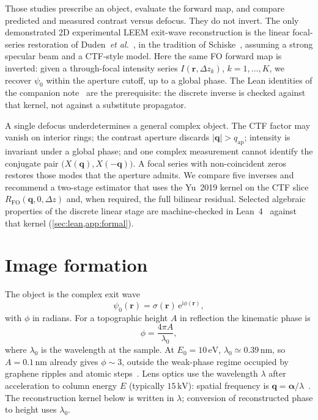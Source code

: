 \documentclass[11pt,a4paper]{article}
\theoremstyle{definition}
\theoremstyle{remark}
\newcommand{\ee}{\mathrm{e}}
\newcommand{\ii}{\mathrm{i}}
\newcommand{\abs}[1]{\lvert#1\rvert}
\newcommand{\qap}{q_{\mathrm{ap}}}
\newcommand{\Dz}{\Delta z}
\newcommand{\RFO}{R_{\mathrm{FO}}}
\begin{document}
Those studies prescribe an object, evaluate the forward map, and
compare predicted and measured contrast versus defocus.
They do not invert.
The only demonstrated 2D experimental LEEM exit-wave reconstruction is
the linear focal-series restoration of Duden~\emph{et
al.}~\cite{Duden2014}, in the tradition of
Schiske~\cite{Schiske1968,Schiske1973}, assuming a strong specular beam
and a CTF-style model.
Here the same FO forward map is inverted: given a through-focal
intensity series $I(\mathbf{r},\Dz_k)$, $k=1,\dots,K$, we recover
$\psi_0$ within the aperture cutoff, up to a global phase.
The Lean identities of the companion note~\cite{Lau2026proofs} are the
prerequisite: the discrete inverse is checked against that kernel,
not against a substitute propagator.

A single defocus underdetermines a general complex object.
The CTF factor may vanish on interior rings; the contrast aperture
discards $\abs{\mathbf{q}}>\qap$; intensity is invariant under a global
phase; and one complex measurement cannot identify the conjugate pair
$\bigl(X(\mathbf{q}),X(-\mathbf{q})\bigr)$.
A focal series with non-coincident zeros restores those modes that the
aperture admits.
We compare five inverses and recommend a two-stage estimator that
uses the Yu~2019 kernel on the CTF slice
$\RFO(\mathbf{q},0,\Dz)$ and, when required, the full bilinear
residual.
Selected algebraic properties of the discrete linear stage are
machine-checked in Lean~4~\cite{deMoura2021} against that kernel
(\cref{sec:lean,app:formal}).

\section{Image formation}
\label{sec:formation}

The object is the complex exit wave
\begin{equation}
\label{eq:psi0}
\psi_0(\mathbf{r})=\sigma(\mathbf{r})\,\ee^{\ii\phi(\mathbf{r})},
\end{equation}
with $\phi$ in radians.
For a topographic height $A$ in reflection the kinematic phase is
\begin{equation}
\label{eq:phiA}
\phi=\frac{4\pi A}{\lambda_0},
\end{equation}
where $\lambda_0$ is the wavelength at the sample.
At $E_0=10\,\mathrm{eV}$, $\lambda_0\simeq 0.39\,\mathrm{nm}$, so
$A=0.1\,\mathrm{nm}$ already gives $\phi\sim 3$, outside the
weak-phase regime occupied by graphene ripples and atomic
steps~\cite{Yu2017}.
Lens optics use the wavelength $\lambda$ after acceleration to column
energy $E$ (typically $15\,\mathrm{kV}$): spatial frequency is
$\mathbf{q}=\boldsymbol{\alpha}/\lambda$~\cite{Tromp2012,Schramm2012}.
The reconstruction kernel below is written in $\lambda$; conversion of
reconstructed phase to height uses $\lambda_0$.
\end{document}
